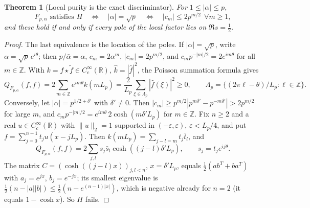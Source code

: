 \documentclass[11pt,reqno]{amsart}
\newtheorem{theorem}{Theorem}[section]
\theoremstyle{definition}
\newcommand{\R}{\mathbb{R}}
\newcommand{\Z}{\mathbb{Z}}
\newcommand{\half}{\tfrac12}
\begin{document}
\begin{theorem}[Local purity is the exact discriminator]\label{thm:local-purity}
For $1\le|\alpha|\le p$,
\[
F_{p,\alpha}\text{ satisfies }H\quad\Longleftrightarrow\quad|\alpha|=\sqrt p
\quad\Longleftrightarrow\quad|c_m|\le2p^{m/2}\ \ \forall m\ge1 ,
\]
and these hold if and only if every pole of the local factor lies on
$\Re s=\half$.
\end{theorem}
\begin{proof}
The last equivalence is the location of the poles. If $|\alpha|=\sqrt p$, write
$\alpha=\sqrt p\,e^{i\theta}$; then $p/\bar\alpha=\alpha$, $c_m=2\alpha^m$,
$|c_m|=2p^{m/2}$, and $c_mp^{-|m|/2}=2e^{im\theta}$ for all $m\in\Z$. With
$k=f\star\tilde f\in C_c^\infty(\R)$, $\widehat k=|\widehat f|^2$, the Poisson
summation formula gives
\[
Q_{F_{p,\alpha}}(f,f)=2\sum_{m\in\Z}e^{im\theta}k(mL_p)
=\frac{2}{L_p}\sum_{\xi\in\Lambda_p}|\widehat f(\xi)|^2\ge0,\qquad
\Lambda_p=\{(2\pi\ell-\theta)/L_p:\ell\in\Z\}.
\]
Conversely, let $|\alpha|=p^{1/2+\delta'}$ with $\delta'\neq0$. Then
$|c_m|\ge p^{m/2}|p^{m\delta'}-p^{-m\delta'}|>2p^{m/2}$ for large $m$, and
$c_mp^{-|m|/2}=e^{im\theta}\,2\cosh(m\delta'L_p)$ for $m\in\Z$. Fix $n\ge2$ and
a real $u\in C_c^\infty(\R)$ with $\|u\|_2=1$ supported in $(-\varepsilon,\varepsilon)$,
$\varepsilon<L_p/4$, and put $f=\sum_{j=0}^{n-1}t_ju(x-jL_p)$. Then
$k(mL_p)=\sum_{j-l=m}t_j\bar t_l$, and
\[
Q_{F_{p,\alpha}}(f,f)=2\sum_{j,l}s_j\bar s_l\cosh((j-l)\delta'L_p),\qquad
s_j=t_je^{ij\theta}.
\]
The matrix $C=(\cosh((j-l)x))_{j,l<n}$, $x=\delta'L_p$, equals
$\half(ab^{T}+ba^{T})$ with $a_j=e^{jx}$, $b_j=e^{-jx}$; its smallest eigenvalue
is $\half(n-|a||b|)\le\half(n-e^{(n-1)|x|})$, which is negative already for
$n=2$ (it equals $1-\cosh x$). So $H$ fails.
\end{proof}
\end{document}
